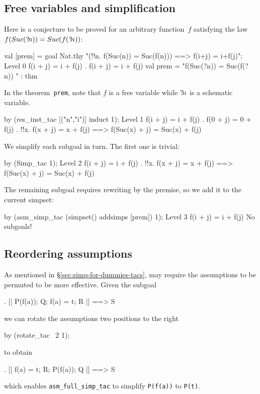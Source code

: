 \subsection{Free variables and simplification}
Here is a conjecture to be proved for an arbitrary function~$f$ satisfying
the law $f(Suc({?\!n})) = Suc(f({?\!n}))$:
\begin{ttbox}
val [prem] = goal Nat.thy
    "(!!n. f(Suc(n)) = Suc(f(n))) ==> f(i+j) = i+f(j)";
{\out Level 0}
{\out f(i + j) = i + f(j)}
{. f(i + j) = i + f(j)}
\ttbreak
{\out val prem = "f(Suc(?n)) = Suc(f(?n))}
{\out             [!!n. f(Suc(n)) = Suc(f(n))]" : thm}
\end{ttbox}
In the theorem~{\tt prem}, note that $f$ is a free variable while
${?\!n}$ is a schematic variable.
\begin{ttbox}
by (res_inst_tac [("n","i")] induct 1);
{\out Level 1}
{\out f(i + j) = i + f(j)}
{. f(0 + j) = 0 + f(j)}
{. !!x. f(x + j) = x + f(j) ==> f(Suc(x) + j) = Suc(x) + f(j)}
\end{ttbox}
We simplify each subgoal in turn.  The first one is trivial:
\begin{ttbox}
by (Simp_tac 1);
{\out Level 2}
{\out f(i + j) = i + f(j)}
{. !!x. f(x + j) = x + f(j) ==> f(Suc(x) + j) = Suc(x) + f(j)}
\end{ttbox}
The remaining subgoal requires rewriting by the premise, so we add it
to the current simpset:
\begin{ttbox}
by (asm_simp_tac (simpset() addsimps [prem]) 1);
{\out Level 3}
{\out f(i + j) = i + f(j)}
{\out No subgoals!}
\end{ttbox}

\subsection{Reordering assumptions}
\label{sec:reordering-asms}

As mentioned in \S\ref{sec:simp-for-dummies-tacs},
 may require the assumptions to be permuted
to be more effective.  Given the subgoal
\begin{ttbox}
{. [| P(f(a)); Q; f(a) = t; R |] ==> S}
\end{ttbox}
we can rotate the assumptions two positions to the right
\begin{ttbox}
by (rotate_tac ~2 1);
\end{ttbox}
to obtain
\begin{ttbox}
{. [| f(a) = t; R; P(f(a)); Q |] ==> S}
\end{ttbox}
which enables \verb$asm_full_simp_tac$ to simplify \verb$P(f(a))$ to
\verb$P(t)$.

